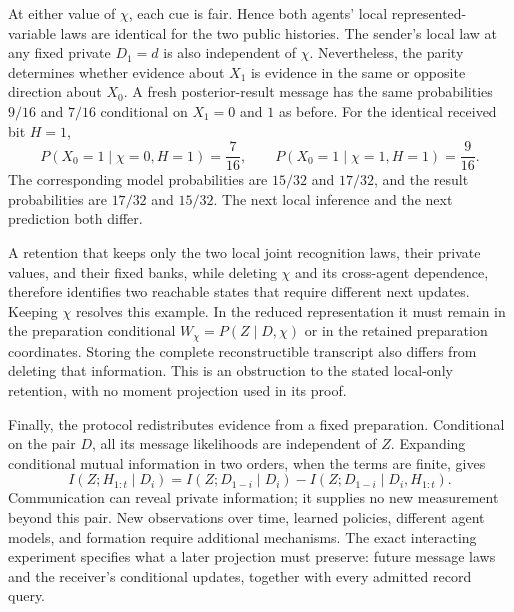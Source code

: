 At either value of $\chi$, each cue is fair. Hence both agents' local represented-variable laws are identical for the two public histories. The sender's local law at any fixed private $D_1=d$ is also independent of $\chi$. Nevertheless, the parity determines whether evidence about $X_1$ is evidence in the same or opposite direction about $X_0$. A fresh posterior-result message has the same probabilities $9/16$ and $7/16$ conditional on $X_1=0$ and $1$ as before. For the identical received bit $H=1$,
\begin{equation}
P(X_0=1\mid \chi=0,H=1)=\frac7{16},\qquad
P(X_0=1\mid \chi=1,H=1)=\frac9{16}.
\end{equation}
The corresponding model probabilities are $15/32$ and $17/32$, and the result probabilities are $17/32$ and $15/32$. The next local inference and the next prediction both differ.

A retention that keeps only the two local joint recognition laws, their private values, and their fixed banks, while deleting $\chi$ and its cross-agent dependence, therefore identifies two reachable states that require different next updates. Keeping $\chi$ resolves this example. In the reduced representation it must remain in the preparation conditional $W_\chi=P(Z\mid D,\chi)$ or in the retained preparation coordinates. Storing the complete reconstructible transcript also differs from deleting that information. This is an obstruction to the stated local-only retention, with no moment projection used in its proof.

Finally, the protocol redistributes evidence from a fixed preparation. Conditional on the pair $D$, all its message likelihoods are independent of $Z$. Expanding conditional mutual information in two orders, when the terms are finite, gives
\begin{equation}
I(Z;H_{1:t}\mid D_i)
=I(Z;D_{1-i}\mid D_i)
-I(Z;D_{1-i}\mid D_i,H_{1:t}).
\end{equation}
Communication can reveal private information; it supplies no new measurement beyond this pair. New observations over time, learned policies, different agent models, and formation require additional mechanisms. The exact interacting experiment specifies what a later projection must preserve: future message laws and the receiver's conditional updates, together with every admitted record query.
